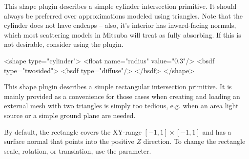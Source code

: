 This shape plugin describes a simple cylinder intersection primitive.
It should always be preferred over approximations modeled using
triangles. Note that the cylinder does not have endcaps -- also,
it's interior has inward-facing normals, which most scattering
models in Mitsuba will treat as fully absorbing. If this is not
desirable, consider using the  plugin.

\begin{xml}[caption={A simple example for instantiating a
cylinder, whose interior is visible}, label=lst:cylinder-twosided]
<shape type="cylinder">
    <float name="radius" value="0.3"/>
    <bsdf type="twosided">
        <bsdf type="diffuse"/>
    </bsdf>
</shape>
\end{xml}

This shape plugin describes a simple rectangular intersection primitive.
It is mainly provided as a convenience for those cases when creating and
loading an external mesh with two triangles is simply too tedious, e.g.
when an area light source or a simple ground plane are needed.

By default, the rectangle covers the XY-range $[-1,1]\times[-1,1]$
and has a surface normal that points into the positive $Z$ direction.
To change the rectangle scale, rotation, or translation, use the
 parameter.

